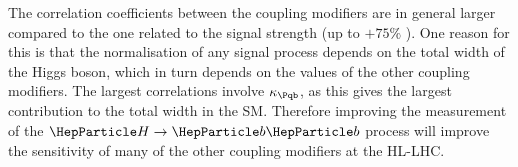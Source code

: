 \begin{table}[hbtp]
\centering
\caption{The expected $\pm 1\sigma$ uncertainties, expressed as percentages, on the coupling modifier parameters.%
Values are given for both S1 (with Run~2 systematic uncertainties~\cite{Sirunyan:2018koj}) and S2 (with YR18 systematic uncertainties). The total uncertainty is decomposed into four components: statistical (Stat), signal theory (SigTh), background theory (BkgTh) and experimental (Exp).}
\small
\hspace{0.5cm}

\label{tab:summary_K2}
\vspace{0.5cm}
\end{table}




The correlation coefficients between the coupling modifiers are in general larger compared to the one related to the signal strength (up to $+75\%$ ). One reason for this is that the normalisation of any signal process depends on the total width of the Higgs boson, which in turn depends on the values of the other coupling modifiers. The largest correlations involve $\kb$, as this gives the largest contribution to the total width in the SM. Therefore improving the measurement of the $\hbb$ process will improve the sensitivity of many of the other coupling modifiers at the HL-LHC.



